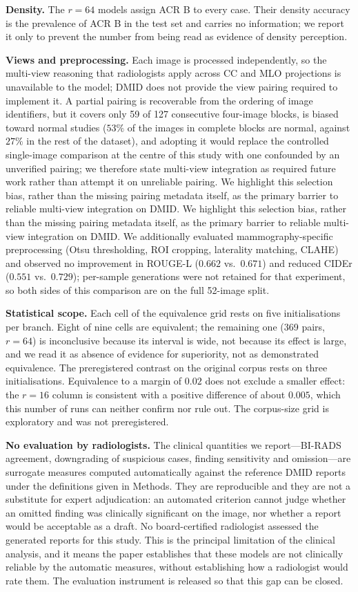 \documentclass{wlscirep}
\newif\ifmarkup
\newif\ifmarkbar
\newcommand{\rev}[1]{%
  \ifmarkup
    \ifmarkbar\cbstart#1\cbend\else\textcolor{revised}{#1}\fi
  \else#1\fi}
\begin{document}
\textbf{Density.} The $r=64$ models assign ACR B to every case. Their density accuracy is the prevalence of ACR B in the test set and carries no information; we report it only to prevent the number from being read as evidence of density perception.

\textbf{Views and preprocessing.} Each image is processed independently, so the multi-view reasoning that radiologists apply across CC and MLO projections is unavailable to the model; DMID does not provide the view pairing required to implement it. A partial pairing is recoverable from the ordering of image identifiers, but it covers only 59 of 127 consecutive four-image blocks, is biased toward normal studies ($53\%$ of the images in complete blocks are normal, against $27\%$ in the rest of the dataset), and adopting it would replace the controlled single-image comparison at the centre of this study with one confounded by an unverified pairing; we therefore state multi-view integration as required future work rather than attempt it on unreliable pairing. \rev{We highlight this selection bias, rather than the missing pairing metadata itself, as the primary barrier to reliable multi-view integration on DMID.} We additionally evaluated mammography-specific preprocessing (Otsu thresholding, ROI cropping, laterality matching, CLAHE) and observed no improvement in ROUGE-L ($0.662$ vs.\ $0.671$) and reduced CIDEr ($0.551$ vs.\ $0.729$); per-sample generations were not retained for that experiment, so both sides of this comparison are on the full 52-image split.

\textbf{Statistical scope.} Each cell of the equivalence grid rests on five initialisations per branch. Eight of nine cells are equivalent; the remaining one (369 pairs, $r=64$) is inconclusive because its interval is wide, not because its effect is large, and we read it as absence of evidence for superiority, not as demonstrated equivalence. The preregistered contrast on the original corpus rests on three initialisations. Equivalence to a margin of $0.02$ does not exclude a smaller effect: the $r=16$ column is consistent with a positive difference of about $0.005$, which this number of runs can neither confirm nor rule out. The corpus-size grid is exploratory and was not preregistered.

\textbf{No evaluation by radiologists.} The clinical quantities we report---BI-RADS agreement, downgrading of suspicious cases, finding sensitivity and omission---are surrogate measures computed automatically against the reference DMID reports under the definitions given in Methods. They are reproducible and they are not a substitute for expert adjudication: an automated criterion cannot judge whether an omitted finding was clinically significant on the image, nor whether a report would be acceptable as a draft. No board-certified radiologist assessed the generated reports for this study. This is the principal limitation of the clinical analysis, and it means the paper establishes that these models are not clinically reliable by the automatic measures, without establishing how a radiologist would rate them. The evaluation instrument is released so that this gap can be closed.
\end{document}
